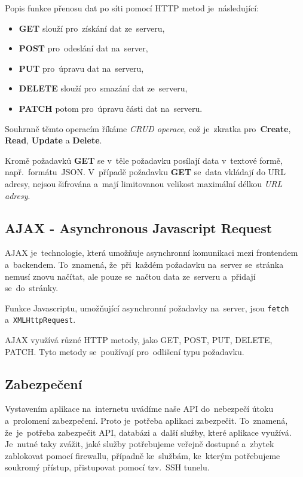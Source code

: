 \documentclass[14pt,a4paper]{article}
\begin{document}
        Popis funkce přenosu dat po síti pomocí HTTP metod je~následující:
        \begin{itemize}
            \item \textbf{GET} slouží pro~získání dat ze~serveru,
            \item \textbf{POST} pro~odeslání dat na~server,
            \item \textbf{PUT} pro~úpravu dat na~serveru,
            \item \textbf{DELETE} slouží pro~smazání dat ze~serveru,
            \item \textbf{PATCH} potom pro~úpravu části dat na~serveru.
        \end{itemize}

        Souhrnně těmto operacím říkáme \emph{CRUD operace}, což je~zkratka pro~\textbf{Create}, \textbf{Read}, \textbf{Update} a \textbf{Delete}.

        Kromě požadavků \textbf{GET} se v~těle požadavku posílají data v~textové formě, např.~formátu~JSON. 
        V~případě požadavku \textbf{GET} se~data vkládají do URL adresy, nejsou šifrována a~mají limitovanou velikost maximální délkou \emph{URL adresy}.

        \subsection{AJAX - Asynchronous Javascript Request}
        AJAX je~technologie, která umožňuje asynchronní komunikaci mezi frontendem a~backendem.
        To~znamená, že~při~každém požadavku na~server se~stránka nemusí znovu načítat, ale pouze se~načtou data ze~serveru a~přidají se~do~stránky.

        Funkce Javascriptu, umožňující asynchronní požadavky na~server, jsou \texttt{fetch} a~\texttt{XMLHttpRequest}.

        AJAX využívá různé HTTP metody, jako GET, POST, PUT, DELETE, PATCH. Tyto metody se~používají pro~odlišení typu požadavku.

        \subsection{Zabezpečení}
        Vystavením aplikace na~internetu uvádíme naše API do~nebezpečí útoku a~prolomení zabezpečení. Proto je~potřeba aplikaci zabezpečit.
        To~znamená, že~je~potřeba zabezpečit API, databázi a~další služby, které aplikace využívá. Je~nutné taky zvážit,
        jaké služby potřebujeme veřejně dostupné a~zbytek zablokovat pomocí firewallu, případně ke~službám, ke~kterým potřebujeme soukromý přístup,
        přistupovat pomocí tzv.~SSH tunelu.
\end{document}
